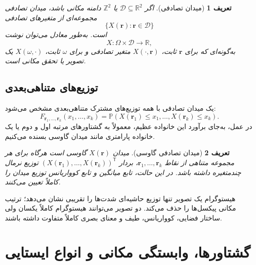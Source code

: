 \documentclass[12pt,openany,oneside]{book}
\newtheorem{definition}{تعریف}[chapter]
\newcommand{\R}{\mathbb{R}}
\newcommand{\Z}{\mathbb{Z}}
\newcommand{\Prob}{\mathbb{P}}
\newcommand{\trans}{^{\mathsf T}}
\newcommand{\vect}[1]{\bm{#1}}
\begin{document}
\begin{definition}[میدان تصادفی]
اگر \(\mathcal D\subseteq\R^2\) یا \(\Z^2\) دامنه مکانی باشد، میدان تصادفی مجموعه‌ای از متغیرهای
تصادفی
\begin{equation}
\{X(\vect{r}):\vect{r}\in\mathcal D\}
\end{equation}
است. به‌طور معادل می‌توان نوشت
\begin{equation}
X:\Omega\times\mathcal D\to\R,
\end{equation}
به‌گونه‌ای که برای \(\vect{r}\) ثابت، \(X(\cdot,\vect{r})\) متغیر تصادفی و برای \(\omega\) ثابت،
\(X(\omega,\cdot)\) یک تصویر یا تحقق مکانی است.
\end{definition}

\subsection{توزیع‌های متناهی‌بعدی}

یک میدان تصادفی با همه توزیع‌های مشترک متناهی‌بعدی مشخص می‌شود:
\begin{equation}
F_{\vect{r}_1,\ldots,\vect{r}_k}(x_1,\ldots,x_k)
=
\Prob\!\left(X(\vect{r}_1)\le x_1,\ldots,X(\vect{r}_k)\le x_k\right).
\end{equation}
در عمل، به‌جای برآورد این خانواده عظیم، معمولاً به گشتاورهای مرتبه اول و دوم یا یک خانواده پارامتری
مانند میدان گاوسی بسنده می‌کنیم.

\begin{definition}[میدان تصادفی گاوسی]
میدان \(X(\vect{r})\) گاوسی است هرگاه برای هر مجموعه متناهی از نقاط
\(\vect{r}_1,\ldots,\vect{r}_k\)، بردار
\((X(\vect{r}_1),\ldots,X(\vect{r}_k))\trans\) توزیع نرمال چندمتغیره داشته باشد.
در این حالت، تابع میانگین و تابع کوواریانس توزیع میدان را کاملاً تعیین می‌کنند.
\end{definition}

\begin{warningbox}
هیستوگرام یک تصویر تنها توزیع حاشیه‌ای شدت‌ها را تقریبی نشان می‌دهد؛ ترتیب مکانی پیکسل‌ها را حذف می‌کند.
دو تصویر می‌توانند هیستوگرام کاملاً یکسان ولی ساختار فضایی، کوواریانس، طیف و معنای بصری کاملاً متفاوت داشته باشند.
\end{warningbox}

\section{گشتاورها، وابستگی مکانی و انواع ایستایی}
\end{document}
